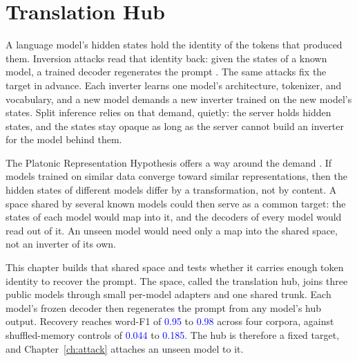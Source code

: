 
\providecommand{\vf}[1]{\textcolor{blue}{#1}}
\providecommand{\rd}[1]{\textcolor{orange}{#1}} %

\chapter{Translation Hub}\label{ch:hub}

A language model's hidden states hold the identity of the tokens that produced them. Inversion attacks read that identity back: given the states of a known model, a trained decoder regenerates the prompt . The same attacks fix the target in advance. Each inverter learns one model's architecture, tokenizer, and vocabulary, and a new model demands a new inverter trained on the new model's states. Split inference relies on that demand, quietly: the server holds hidden states, and the states stay opaque as long as the server cannot build an inverter for the model behind them.

The Platonic Representation Hypothesis offers a way around the demand \cite{huh2024platonic}. If models trained on similar data converge toward similar representations, then the hidden states of different models differ by a transformation, not by content. A space shared by several known models could then serve as a common target: the states of each model would map into it, and the decoders of every model would read out of it. An unseen model would need only a map into the shared space, not an inverter of its own.

This chapter builds that shared space and tests whether it carries enough token identity to recover the prompt. The space, called the translation hub, joins three public models through small per-model adapters and one shared trunk. Each model's frozen decoder then regenerates the prompt from any model's hub output. Recovery reaches word-F1 of \vf{0.95} to \vf{0.98} across four corpora, against shuffled-memory controls of \vf{0.044} to \vf{0.185}. The hub is therefore a fixed target, and Chapter~\ref{ch:attack} attaches an unseen model to it. %

